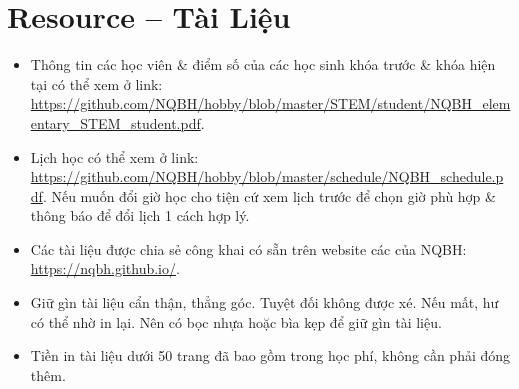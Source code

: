 \documentclass{article}
\numberwithin{equation}{section}
\begin{document}

\section{Resource -- Tài Liệu}

\begin{itemize}
	\item Thông tin các học viên \& điểm số của các học sinh khóa trước \& khóa hiện tại có thể xem ở link:\\\url{https://github.com/NQBH/hobby/blob/master/STEM/student/NQBH_elementary_STEM_student.pdf}.
	\item Lịch học có thể xem ở link: \url{https://github.com/NQBH/hobby/blob/master/schedule/NQBH_schedule.pdf}. Nếu muốn đổi giờ học cho tiện cứ xem lịch trước để chọn giờ phù hợp \& thông báo để đổi lịch 1 cách hợp lý.
	\item Các tài liệu được chia sẻ công khai có sẵn trên website các của NQBH: \url{https://nqbh.github.io/}.
	\item Giữ gìn tài liệu cẩn thận, thẳng góc. Tuyệt đối không được xé. Nếu mất, hư có thể nhờ in lại. Nên có bọc nhựa hoặc bìa kẹp để giữ gìn tài liệu.
	\item Tiền in tài liệu dưới 50 trang đã bao gồm trong học phí, không cần phải đóng thêm.
\end{itemize}


\printbibliography[heading=bibintoc]
	
\end{document}
